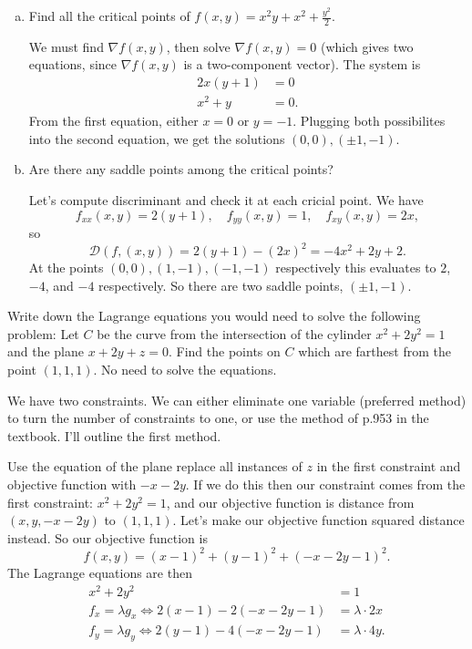 \begin{problem}\leavevmode
  \begin{enumerate}[(a)]
    \item Find all the critical points of $f(x,y)=x^2y+x^2+\frac{y^2}2$.
    \begin{solution}
      We must find $\nabla f(x,y)$, then solve $\nabla f(x,y)=0$ (which gives two equations, since $\nabla f(x,y)$ is a two-component vector). The system is
      \begin{align*}
        2x(y+1) &=0\\
        x^2+y &= 0.
      \end{align*}
      From the first equation, either $x=0$ or $y=-1$. Plugging both possibilites into the second equation, we get the solutions $(0,0),(\pm 1,-1)$.
    \end{solution}
    \item Are there any saddle points among the critical points?
    \begin{solution}
      Let's compute discriminant and check it at each cricial point. We have
      \[f_{xx}(x,y)=2(y+1),\quad f_{yy}(x,y)=1,\quad f_{xy}(x,y)=2x,\]
      so
      \[\mathcal D(f,(x,y))=2(y+1)-(2x)^2=-4x^2+2y+2.\]
      At the points $(0,0),(1,-1),(-1,-1)$ respectively this evaluates to $2$, $-4$, and $-4$ respectively. So there are two saddle points, $(\pm1,-1)$.
    \end{solution}
  \end{enumerate}
\end{problem}

\begin{problem}
  Write down the Lagrange equations you would need to solve the following problem: Let $C$ be the curve from the intersection of the cylinder $x^2+2y^2=1$ and the plane $x+2y+z=0$. Find the points on $C$ which are farthest from the point $(1,1,1)$. No need to solve the equations.
\end{problem}
\begin{solution}
  We have two constraints. We can either eliminate one variable (preferred method) to turn the number of constraints to one, or use the method of p.953 in the textbook. I'll outline the first method.

  Use the equation of the plane replace all instances of $z$ in the first constraint and objective function with $-x-2y$. If we do this then our constraint comes from the first constraint: $x^2+2y^2=1$, and our objective function is distance from $(x,y,-x-2y)$ to $(1,1,1)$. Let's make our objective function squared distance instead. So our objective function is
  \[f(x,y)=(x-1)^2+(y-1)^2+(-x-2y-1)^2.\]
  The Lagrange equations are then
  \begin{align*}
    x^2+2y^2 &= 1\\
    f_x=\lambda g_x \iff 2(x-1)-2(-x-2y-1) &= \lambda \cdot 2x\\
    f_y=\lambda g_y\iff 2(y-1)-4(-x-2y-1) &= \lambda\cdot 4y.
  \end{align*}
\end{solution}

